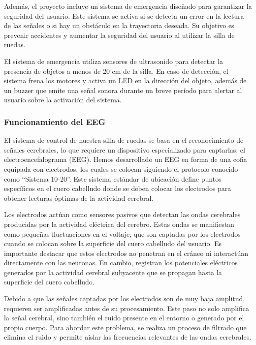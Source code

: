 \documentclass{article}
\begin{document}
Además, el proyecto incluye un sistema de emergencia diseñado para garantizar la seguridad del usuario. Este sistema se activa si se detecta un error en la lectura de las señales o si hay un obstáculo en la trayectoria deseada. Su objetivo es prevenir accidentes y aumentar la seguridad del usuario al utilizar la silla de ruedas.

El sistema de emergencia utiliza sensores de ultrasonido para detectar la presencia de objetos a menos de 20 cm de la silla. En caso de detección, el sistema frena los motores y activa un LED en la dirección del objeto, además de un buzzer que emite una señal sonora durante un breve período para alertar al usuario sobre la activación del sistema.

\subsubsection{Funcionamiento del EEG}

El sistema de control de nuestra silla de ruedas se basa en el reconocimiento de señales cerebrales, lo que requiere un dispositivo especializado para captarlas: el electroencefalograma (EEG). Hemos desarrollado un EEG en forma de una cofia equipada con electrodos, los cuales se colocan siguiendo el protocolo conocido como “Sistema 10-20”. Este sistema estándar de ubicación define puntos específicos en el cuero cabelludo donde se deben colocar los electrodos para obtener lecturas óptimas de la actividad cerebral.

Los electrodos actúan como sensores pasivos que detectan las ondas cerebrales producidas por la actividad eléctrica del cerebro. Estas ondas se manifiestan como pequeñas fluctuaciones en el voltaje, que son captadas por los electrodos cuando se colocan sobre la superficie del cuero cabelludo del usuario. Es importante destacar que estos electrodos no penetran en el cráneo ni interactúan directamente con las neuronas. En cambio, registran los potenciales eléctricos generados por la actividad cerebral subyacente que se propagan hasta la superficie del cuero cabelludo.

Debido a que las señales captadas por los electrodos son de muy baja amplitud, requieren ser amplificadas antes de su procesamiento. Este paso no solo amplifica la señal cerebral, sino también el ruido presente en el entorno o generado por el propio cuerpo. Para abordar este problema, se realiza un proceso de filtrado que elimina el ruido y permite aislar las frecuencias relevantes de las ondas cerebrales.
\end{document}

